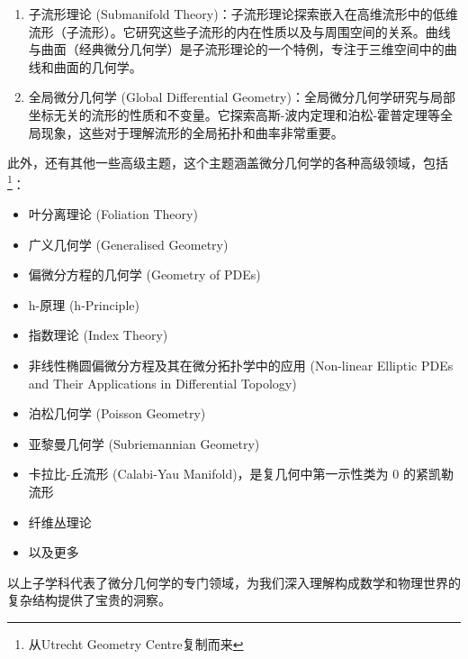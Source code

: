 \begin{enumerate}
\item 子流形理论 (Submanifold Theory)：子流形理论探索嵌入在高维流形中的低维流形（子流形）。它研究这些子流形的内在性质以及与周围空间的关系。曲线与曲面（经典微分几何学）是子流形理论的一个特例，专注于三维空间中的曲线和曲面的几何学。

\item 全局微分几何学 (Global Differential Geometry)：全局微分几何学研究与局部坐标无关的流形的性质和不变量。它探索高斯-波内定理和泊松-霍普定理等全局现象，这些对于理解流形的全局拓扑和曲率非常重要。
\end{enumerate}


此外，还有其他一些高级主题，这个主题涵盖微分几何学的各种高级领域，包括\footnote{从Utrecht Geometry Centre复制而来}：

\begin{itemize}
\item 叶分离理论 (Foliation Theory)
\item 广义几何学 (Generalised Geometry)
\item 偏微分方程的几何学 (Geometry of PDEs)
\item h-原理 (h-Principle)
\item 指数理论 (Index Theory)
\item 非线性椭圆偏微分方程及其在微分拓扑学中的应用 (Non-linear Elliptic PDEs and Their Applications in Differential Topology)
\item 泊松几何学 (Poisson Geometry)
\item 亚黎曼几何学 (Subriemannian Geometry)
\item 卡拉比-丘流形 (Calabi-Yau Manifold)，是复几何中第一示性类为 $0$ 的紧凯勒流形
\item 纤维丛理论
\item 以及更多
\end{itemize}

以上子学科代表了微分几何学的专门领域，为我们深入理解构成数学和物理世界的复杂结构提供了宝贵的洞察。

 